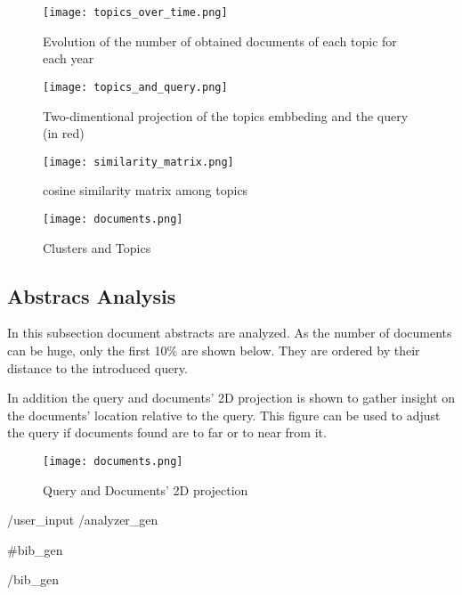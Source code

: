 \documentclass{article}
\begin{document}
\begin{figure}[ht]
  \centering
  \caption{Evolution of the number of obtained documents of each topic for each year}
  \texttt{[image: topics\_over\_time.png]}
\end{figure}

\begin{figure}[ht]
  \centering
  \caption{Two-dimentional projection of the topics embbeding and the query (in red)}
  \texttt{[image: topics\_and\_query.png]}
\end{figure}

\begin{figure}[ht]
  \centering
  \caption{cosine similarity matrix among topics}
  \texttt{[image: similarity\_matrix.png]}
\end{figure}

\begin{figure}[ht]
  \centering
  \caption{Clusters and Topics}
  \texttt{[image: documents.png]}
\end{figure}

\clearpage

\subsection{Abstracs Analysis}
In this subsection document abstracts are analyzed. As the number of documents can be huge, only the first 10\% are shown below. They are ordered by their distance to the introduced query.

\begin{table}[ht]
  \centering
   
\end{table}

\clearpage

In addition the query and documents' 2D projection is shown to gather insight on the documents' location relative to the query. This figure can be used to adjust the query if documents found are to far or to near from it.

\begin{figure}[ht]
  \centering
  \caption{Query and Documents' 2D projection}
  \texttt{[image: documents.png]}
\end{figure}

{{/user_input}}
{{/analyzer_gen}}

\nocite{*} %

{{#bib_gen}}
\renewcommand{\refname}{Full References results obtained from the integrated AI}
  
 
{{/bib_gen}}
\end{document}
